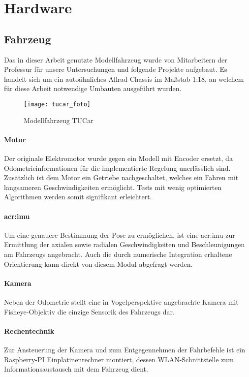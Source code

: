 \section{Hardware}
\subsection{Fahrzeug}
Das in dieser Arbeit genutzte Modellfahrzeug wurde von Mitarbeitern der Professur für unsere Untersuchungen und folgende Projekte aufgebaut. Es handelt sich um ein autoähnliches Allrad-Chassis im Maßstab 1:18, an welchem für diese Arbeit notwendige Umbauten ausgeführt wurden.
\begin{figure}[H] %
	\centering
	\texttt{[image: tucar\_foto]}
	\caption{Modellfahrzeug \glqq TUCar \grqq}
	\label{fig:tucar_foto}
\end{figure}
\paragraph{Motor}
Der originale Elektromotor wurde gegen ein Modell mit Encoder ersetzt, da Odometrieinformationen für die implementierte Regelung unerlässlich sind. Zusätzlich ist dem Motor ein Getriebe nachgeschaltet, welches ein Fahren mit langsameren Geschwindigkeiten ermöglicht. Tests mit wenig optimierten Algorithmen werden somit signifikant erleichtert.
\paragraph{\gls{acr:imu}}
Um eine genauere Bestimmung der Pose zu ermöglichen, ist eine \gls{acr:imu} zur Ermittlung der axialen sowie radialen Geschwindigkeiten und Beschleunigungen am Fahrzeugs angebracht. Auch die durch numerische Integration erhaltene Orientierung kann direkt von diesem Modul abgefragt werden. 
\paragraph{Kamera}
Neben der Odometrie stellt eine in Vogelperspektive angebrachte Kamera mit Fisheye-Objektiv die einzige Sensorik des Fahrzeugs dar.
\paragraph{Rechentechnik}
Zur Ansteuerung der Kamera und zum Entgegennehmen der Fahrbefehle ist ein Raspberry-PI Einplatinenrechner montiert, dessen WLAN-Schnittstelle zum Informationsaustausch mit dem Fahrzeug dient.
